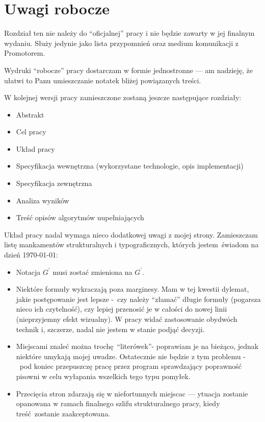 \chapter{Uwagi robocze}\label{section_notes}
\par{
  Rozdział ten nie należy do ``oficjalnej'' pracy i nie będzie zawarty w jej
 finalnym wydaniu.
 Służy jedynie jako lista przypomnień oraz medium komunikacji z Promotorem.
}
\begin{note}
  Wydruki ``robocze'' pracy dostarczam w formie jednostronne --- am nadzieję, że
  ułatwi to Panu umieszczanie notatek bliżej powiązanych treści.
\end{note}
\begin{note}
  W kolejnej wersji pracy zamieszczone zostaną jeszcze następujące rozdziały:
  \begin{itemize}
    \item Abstrakt
    \item Cel pracy
    \item Układ pracy
    \item Specyfikacja wewnętrzna (wykorzystane technologie, opis
      implementacji)
    \item Specyfikacja zewnętrzna
    \item Analiza wyników
    \item Treść opisów algorytmów uupełniających
  \end{itemize}
  Układ pracy nadal wymaga nieco dodatkowej uwagi z mojej strony.
  Zamieszczam listę mankamentów strukturalnych i typograficznych, których 
  jestem~świadom na dzień \today:
  \begin{itemize}
    \item Notacja $G^\prime$ musi zostać zmieniona na $G^{\prime}$.
    \item Niektóre formuły wykraczają poza marginesy.
      Mam w tej kwestii dylemat, jakie postępowanie jest lepsze -~czy należy
      ``złamać'' długie formuły (pogarsza nieco ich czytelność), czy lepiej 
      przenosić je w całości do nowej linii (nieprzyjemny efekt wizualny).
      W pracy widać zastosowanie obydwóch technik i, szczerze, nadal nie jestem
      w stanie podjąć decyzji.
    \item Miejscami znaleć można trochę ``literówek''- poprawiam je na
      bieżąco, jednak niektóre umykają mojej uwadze.
      Ostatecznie nie będzie z tym problemu -~pod koniec przepuszczę pracę przez
      program sprawdzający poprawność pisowni w celu wyłapania wszelkich tego
      typu pomyłek.
    \item Przecięcia stron zdarzają się w niefortunnych miejscac --- ytuacja
      zostanie opanowana w ramach finalnego szlifu strukturalnego pracy, kiedy
      treść~zostanie zaakceptowana.
  \end{itemize}
\end{note}
